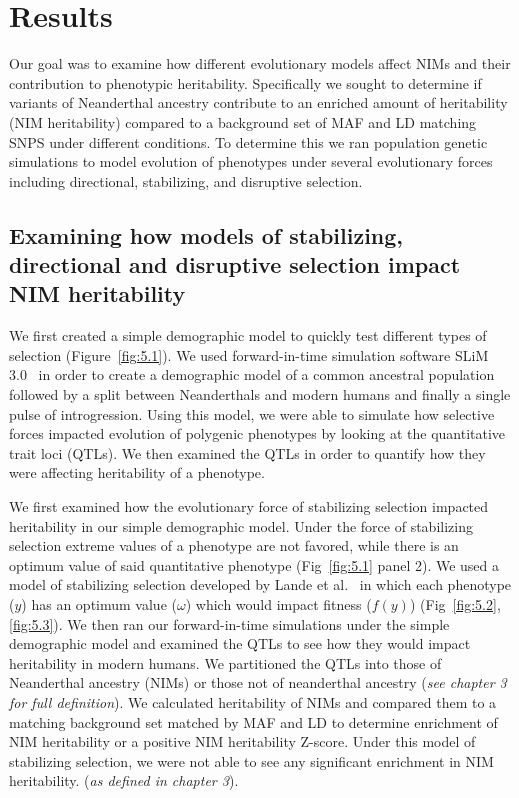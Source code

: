 \section{Results}
Our goal was to examine how different evolutionary models affect NIMs and their contribution to phenotypic heritability. Specifically we sought to determine if variants of Neanderthal ancestry contribute to an enriched amount of heritability (NIM heritability) compared to a background set of MAF and LD matching SNPS under different conditions. To determine this we ran population genetic simulations to model evolution of phenotypes under several evolutionary forces including directional, stabilizing, and disruptive selection. 
\subsection{Examining how models of stabilizing, directional and disruptive selection impact NIM heritability}
We first created a simple demographic model to quickly test different types of selection (Figure~\ref{fig:5.1}). We used forward-in-time simulation software SLiM 3.0~\cite{haller2019slim} in order to create a demographic model of a common ancestral population followed by a split between Neanderthals and modern humans and finally a single pulse of introgression. Using this model, we were able to simulate how selective forces impacted evolution of polygenic phenotypes by looking at the quantitative trait loci (QTLs). We then examined the QTLs in order to quantify how they were affecting heritability of a phenotype.

We first examined how the evolutionary force of stabilizing selection impacted heritability in our simple demographic model. Under the force of stabilizing selection extreme values of a phenotype are not favored, while there is an optimum value of said quantitative phenotype ({Fig~\ref{fig:5.1} panel 2}). We used a model of stabilizing selection developed by Lande et al.~\cite{lande1976natural} in which each phenotype ($y$) has an optimum value ($\omega$) which would impact fitness ($f(y)$) ({Fig~\ref{fig:5.2},\ref{fig:5.3}}). We then ran our forward-in-time simulations under the simple demographic model and examined the QTLs to see how they would impact heritability in modern humans. We partitioned the QTLs into those of Neanderthal ancestry (NIMs) or those not of neanderthal ancestry (\textit{see chapter 3 for full definition}). We calculated heritability of NIMs and compared them to a matching background set matched by MAF and LD to determine enrichment of NIM heritability  or a positive NIM heritability Z-score. Under this model of stabilizing selection, we were not able to see any significant enrichment in NIM heritability. (\textit{as defined in chapter 3}).

